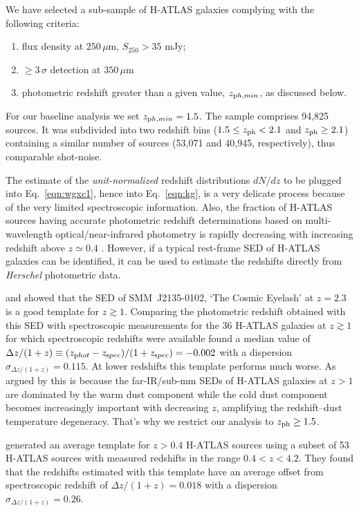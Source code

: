 We have selected a sub-sample of H-ATLAS galaxies complying with the following criteria: 
%
\begin{enumerate} 
\item{flux density at $250\,\mu$m, $S_{250}> 35$ mJy;} \item{$\ge 3\,\sigma$ detection at $350\,\mu$m} 
\item{photometric redshift greater than a given value, $z_{\rm ph, min}$, as discussed below.}
\end{enumerate} 
%
For our baseline analysis we set $z_{\rm ph, min} = 1.5$. The sample comprises 94,825 sources. It was subdivided into two redshift bins ($1.5 \le z_{\rm{ph}} < 2.1$ and $z_{\rm{ph}} \ge 2.1$) containing a similar number of sources (53,071 and 40,945, respectively), thus comparable shot-noise.

The estimate of the \emph{unit-normalized} redshift distributions $dN/dz$ to be plugged into Eq.~\eqref{eqn:wgxc1}, hence into Eq.~\eqref{eqn:kg}, is a very delicate process because of the very limited spectroscopic information. Also, the fraction of H-ATLAS sources having accurate photometric redshift determinations based on multi-wavelength optical/near-infrared photometry is rapidly decreasing with increasing redshift above $z\simeq 0.4$ \citep{Smith2011,Bourne2016}. However, if a typical rest-frame \gls{SED} of H-ATLAS galaxies can be identified, it can be used to estimate the redshifts directly from \textit{Herschel} photometric data.

\citet{Lapi2011} and \citet{Gonzalez-Nuevo2012} showed that the SED of SMM~J2135-0102, `The Cosmic Eyelash' at $z=2.3$ \citep{Ivison2010,Swinbank2010} is a good template for $z\gtrsim 1$. Comparing the photometric redshift obtained with this SED with spectroscopic measurements for the 36 H-ATLAS galaxies at $z\gtrsim 1$ for which spectroscopic redshifts were available \citet{Gonzalez-Nuevo2012} found a median value of $\Delta z/(1+z)\equiv (z_{\rm phot}-z_{\rm spec})/(1+z_{\rm spec})=-0.002$ with a dispersion $\sigma_{\Delta z/(1+z)}= 0.115$. At lower redshifts this template performs much worse. As argued by \citet{Lapi2011} this is because the far-IR/sub-mm SEDs of H-ATLAS galaxies at $z>1$ are dominated by the warm dust component while the cold dust component becomes increasingly important with decreasing $z$, amplifying the redshift--dust temperature degeneracy. That's why we restrict our analysis to $z_{\rm{ph}}\ge1.5$.

\citet{Pearson2013} generated an average template for $z>0.4$  H-ATLAS sources using a subset of 53 H-ATLAS sources with measured redshifts in the range $0.4 < z < 4.2$. They found that the redshifts estimated with this template have an average offset from spectroscopic redshift of $\Delta z/(1+z)=0.018$ with a dispersion  $\sigma_{\Delta z/(1+z)}= 0.26$.

